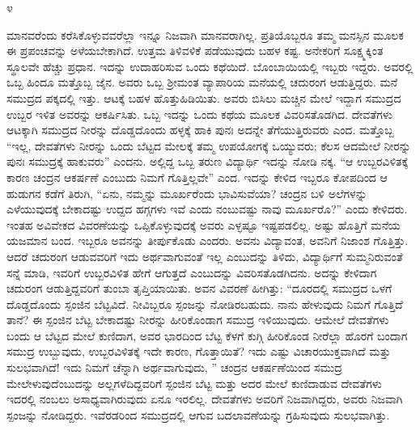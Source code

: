 \begin{center}
೪
\end{center}

ಮಾನವರೆಂದು ಕರೆಸಿಕೊಳ್ಳುವವರೆಲ್ಲಾ ಇನ್ನೂ ನಿಜವಾಗಿ ಮಾನವರಾಗಿಲ್ಲ. ಪ್ರತಿಯೊಬ್ಬರೂ ತಮ್ಮ ಮನಸ್ಸಿನ ಮೂಲಕ ಈ ಪ್ರಪಂಚವನ್ನು ಅಳೆಯಬೇಕಾಗಿದೆ. ಉತ್ತಮ ತಿಳಿವಳಿಕೆ ಪಡೆಯುವುದು ಬಹಳ ಕಷ್ಟ. ಅನೇಕರಿಗೆ ಸೂಕ್ಷ್ಮಕ್ಕಿಂತ ಸ್ಥೂಲವೇ ಹೆಚ್ಚು ಪ್ರಧಾನ. ಇದನ್ನು ಉದಾಹರಿಸುವ ಒಂದು ಕಥೆಯಿದೆ. ಬೊಂಬಾಯಿಯಲ್ಲಿ ಇಬ್ಬರು ಇದ್ದರು. ಅವರಲ್ಲಿ ಒಬ್ಬ ಹಿಂದೂ ಮತ್ತೊಬ್ಬ ಜೈನ. ಅವರು ಒಬ್ಬ ಶ‍್ರೀಮಂತ ವ್ಯಾಪಾರಿಯ ಮನೆಯಲ್ಲಿ ಚದುರಂಗ ಆಡುತ್ತಿದ್ದರು. ಮನೆ ಸಮುದ್ರದ ಪಕ್ಕದಲ್ಲಿ ಇತ್ತು. ಆಟಕ್ಕೆ ಬಹಳ ಹೊತ್ತುಹಿಡಿಯಿತು. ಅವರು ಬಿಸಿಲು ಮಚ್ಚಿನ ಮೇಲೆ ಇದ್ದಾಗ ಸಮುದ್ರದ ಉಬ್ಬರ ಇಳಿತ ಅವರನ್ನು ಆಕರ್ಷಿಸಿತು. ಒಬ್ಬ ಇದನ್ನು ಒಂದು ಕಥೆಯ ಮೂಲಕ ವಿವರಿಸತೊಡಗಿದ. ದೇವತೆಗಳು ಆಟಕ್ಕಾಗಿ ಸಮುದ್ರದ ನೀರನ್ನು ದೊಡ್ಡದೊಂದು ಹಳ್ಳಕ್ಕೆ ಹಾಕಿ ಪುನಃ ಅದನ್ನೇ ತೆಗೆಯುತ್ತಿರುವರು ಎಂದ. ಮತ್ತೊಬ್ಬ “ಇಲ್ಲ, ದೇವತೆಗಳು ನೀರನ್ನು ಒಂದು ಬೆಟ್ಟದ ಮೇಲಕ್ಕೆ ತಮ್ಮ ಉಪಯೋಗಕ್ಕೆ ಒಯ್ಯುವರು; ಕೆಲಸ ಆದಮೇಲೆ ನೀರನ್ನು ಪುನಃ ಸಮುದ್ರಕ್ಕೆ ಹಾಕುವರು” ಎಂದನು. ಅಲ್ಲಿದ್ದ ಒಬ್ಬ ತರುಣ ವಿದ್ಯಾರ್ಥಿ ಇದನ್ನು ನೋಡಿ ನಕ್ಕ. “ಆ ಉಬ್ಬರವಿಳಿತಕ್ಕೆ ಕಾರಣ ಚಂದ್ರನ ಆಕರ್ಷಣೆ ಎಂಬುದು ನಿಮಗೆ ಗೊತ್ತಿಲ್ಲವೇ'' ಎಂದ. ಇದನ್ನು ಕೇಳಿದ ಇಬ್ಬರೂ ಕೋಪದಿಂದ ಆ ಹುಡುಗನ ಕಡೆಗೆ ತಿರುಗಿ, “ಏನು, ನಮ್ಮನ್ನು ಮೂರ್ಖರೆಂದು ಭಾವಿಸುವೆಯಾ? ಚಂದ್ರನ ಬಳಿ ಅಲೆಗಳನ್ನು ಎಳೆಯುವುದಕ್ಕೆ ಬೇಕಾದಷ್ಟು ಉದ್ದದ ಹಗ್ಗಗಳು ಇವೆ ಎಂದು ನಂಬುವಷ್ಟು ನಾವು ಮೂರ್ಖರೊ?” ಎಂದು ಕೇಳಿದರು. ಇಂತಹ ಅವಿವೇಕದ ವಿವರಣೆಯನ್ನು ಒಪ್ಪಿಕೊಳ್ಳುವುದಕ್ಕೆ ಅವರು ಎಳ್ಳಷ್ಟೂ ಇಷ್ಟಪಡಲಿಲ್ಲ. ಅಷ್ಟು ಹೊತ್ತಿಗೆ ಮನೆಯ ಯಜಮಾನ ಬಂದ. ಇಬ್ಬರೂ ಅವನನ್ನು ತೀರ್ಪುಕೊಡು ಎಂದರು. ಅವನು ವಿದ್ಯಾವಂತ, ಅವನಿಗೆ ನಿಜಾಂಶ ಗೊತ್ತಿತ್ತು. ಆದರೆ ಚದುರಂಗ ಆಡುವವರಿಗೆ ಇದು ಅರ್ಥವಾಗುವಂತೆ ಇಲ್ಲ ಎಂಬುದನ್ನು ತಿಳಿದು, ವಿದ್ಯಾರ್ಥಿಗೆ ಸುಮ್ಮನಿರುವಂತೆ ಸನ್ನೆ ಮಾಡಿ, ಇವರಿಗೆ ಉಬ್ಬರವಿಳಿತ ಹೇಗೆ ಆಗುತ್ತದೆ ಎಂಬುದನ್ನು ವಿವರಿಸತೊಡಗಿದನು. ಅದನ್ನು ಕೇಳಿದಾಗ ಚದುರಂಗ ಆಡುತ್ತಿದ್ದವರಿಗೆ ತುಂಬಾ ತೃಪ್ತಿಯಾಯಿತು. ಅವನ ವಿವರಣೆ ಹೀಗಿತ್ತು: “ದೂರದಲ್ಲಿ ಸಮುದ್ರದ ಒಳಗೆ ದೊಡ್ಡದೊಂದು ಸ್ಪಂಜಿನ ಬೆಟ್ಟವಿದೆ. ನೀವಿಬ್ಬರೂ ಸ್ಪಂಜನ್ನು ನೋಡಿರಬಹುದು. ನಾನು ಹೇಳುವುದು ನಿಮಗೆ ಗೊತ್ತಿದೆ ತಾನೆ? ಈ ಸ್ಪಂಜಿನ ಬೆಟ್ಟ ಬೇಕಾದಷ್ಟು ನೀರನ್ನು ಹೀರಿಕೊಂಡಾಗ ಸಮುದ್ರ ಇಳಿಯುವುದು. ಆಮೇಲೆ ದೇವತೆಗಳು ಬಂದು ಆ ಬೆಟ್ಟದ ಮೇಲೆ ಕುಣಿದಾಗ, ಅವರ ಭಾರದಿಂದ ಬೆಟ್ಟ ಕೆಳಗೆ ಕುಗ್ಗಿ ಹೀರಿಕೊಂಡ ನೀರೆಲ್ಲಾ ಹೊರಗೆ ಬಂದಾಗ ಸಮುದ್ರ ಉಬ್ಬುವುದು, ಉಬ್ಬರವಿಳಿತಕ್ಕೆ ಇದೇ ಕಾರಣ, ಗೊತ್ತಾಯಿತೆ? ಇದು ಎಷ್ಟು ವಿಚಾರಯುಕ್ತವಾಗಿದೆ ಮತ್ತು ಸುಲಭವಾಗಿದೆ! ಇದು ನಿಮಗೆ ಚೆನ್ನಾಗಿ ಅರ್ಥವಾಗುವುದು, '' ಚಂದ್ರನ ಆಕರ್ಷಣೆಯಿಂದ ಸಮುದ್ರ ಮೇಲೇಳುವುದೆಂಬುದನ್ನು ಅಲ್ಲಗಳೆದಿದ್ದವರಿಗೆ ಸ್ಪಂಜಿನ ಬೆಟ್ಟ ಮತ್ತು ಅದರ ಮೇಲೆ ಕುಣಿದಾಡುವ ದೇವತೆಗಳು ಇದರಲ್ಲಿ ನಂಬಲು ಅಸಾಧ್ಯವಾಗಿರುವುದು ಏನೂ ಇರಲಿಲ್ಲ. ದೇವತೆಗಳು ಅವರಿಗೆ ನಿಜವಾಗಿದ್ದರು, ಅವರು ನಿಜವಾಗಿ ಸ್ಪಂಜನ್ನು ನೋಡಿದ್ದರು. ಇವೆರಡರಿಂದ ಸಮುದ್ರದಲ್ಲಿ ಆಗುವ ಬದಲಾವಣೆಯನ್ನು ಗ್ರಹಿಸುವುದು ಸುಲಭವಾಗಿತ್ತು.

